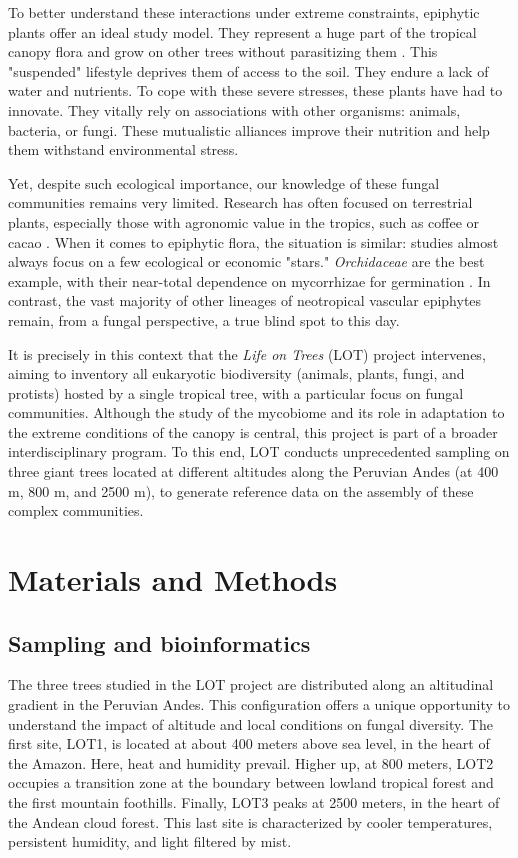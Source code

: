 \documentclass[alpha-refs,twocolumn]{wiley-article}
\begin{document}
To better understand these interactions under extreme constraints, epiphytic plants offer an ideal study model. They represent a huge part of the tropical canopy flora and grow on other trees without parasitizing them \citep{zotz_plants_2016}. This "suspended" lifestyle deprives them of access to the soil. They endure a lack of water and nutrients. To cope with these severe stresses, these plants have had to innovate. They vitally rely on associations with other organisms: animals, bacteria, or fungi. These mutualistic alliances improve their nutrition and help them withstand environmental stress.

Yet, despite such ecological importance, our knowledge of these fungal communities remains very limited. Research has often focused on terrestrial plants, especially those with agronomic value in the tropics, such as coffee or cacao \citep{vega_fungal_2008}. When it comes to epiphytic flora, the situation is similar: studies almost always focus on a few ecological or economic "stars." \textit{Orchidaceae} are the best example, with their near-total dependence on mycorrhizae for germination \citep{dearnaley_orchid_2012}. In contrast, the vast majority of other lineages of neotropical vascular epiphytes remain, from a fungal perspective, a true blind spot to this day.

It is precisely in this context that the \textit{Life on Trees} (LOT) project intervenes, aiming to inventory all eukaryotic biodiversity (animals, plants, fungi, and protists) hosted by a single tropical tree, with a particular focus on fungal communities. Although the study of the mycobiome and its role in adaptation to the extreme conditions of the canopy is central, this project is part of a broader interdisciplinary program. To this end, LOT conducts unprecedented sampling on three giant trees located at different altitudes along the Peruvian Andes (at 400 m, 800 m, and 2500 m), to generate reference data on the assembly of these complex communities.

\section{Materials and Methods}

\subsection{Sampling and bioinformatics}

The three trees studied in the LOT project are distributed along an altitudinal gradient in the Peruvian Andes. This configuration offers a unique opportunity to understand the impact of altitude and local conditions on fungal diversity. The first site, LOT1, is located at about 400 meters above sea level, in the heart of the Amazon. Here, heat and humidity prevail. Higher up, at 800 meters, LOT2 occupies a transition zone at the boundary between lowland tropical forest and the first mountain foothills. Finally, LOT3 peaks at 2500 meters, in the heart of the Andean cloud forest. This last site is characterized by cooler temperatures, persistent humidity, and light filtered by mist.
\end{document}
